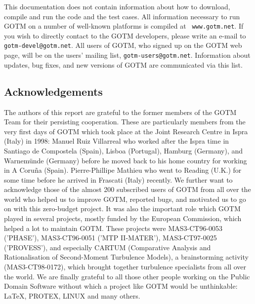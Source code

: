 This documentation does not contain information about how to download,
compile and run the code and the test cases. All information necessary
to run GOTM on a number of well-known platforms is compiled at {\tt
www.gotm.net}. If you wish to directly contact to the GOTM developers,
please write an e-mail to {\tt gotm-devel@gotm.net}. All users of GOTM,
who signed up on the GOTM web page, will be on the users' mailing
list, {\tt gotm-users@gotm.net}. Information about updates, bug fixes, and
new versions of GOTM are communicated via this list.

\subsection{Acknowledgements}

The authors of this report are grateful to the former members of the
GOTM Team for their persisting cooperation. These are particularly
members from the very first days of GOTM which took place at the Joint
Research Centre in Ispra (Italy) in 1998: Manuel Ruiz Villarreal who
worked after the Ispra time in Santiago de Compostela (Spain), Lisboa
(Portugal), Hamburg (Germany), and Warnem\"unde (Germany) before he
moved back to his home country for working in A Coru\~na
(Spain). Pierre-Phillipe Mathieu who went to Reading (U.K.) for some
time before he arrived in Frascati (Italy) recently.  We further want
to acknowledge those of the almost 200 subscribed users of GOTM from
all over the world who helped us to improve GOTM, reported bugs, and
motivated us to go on with this zero-budget project.  It was also the
important role which GOTM played in several projects, mostly funded by
the European Commission, which helped a lot to maintain GOTM.  These
projects were MAS3-CT96-0053 ('PHASE'), MAS3-CT96-0051 ('MTP
II-MATER'), MAS3-CT97-0025 ('PROVESS'), and especially CARTUM
(Comparative Analysis and Rationalisation of Second-Moment Turbulence
Models), a brainstorming activity (MAS3-CT98-0172), which brought
together turbulence specialists from all over the world.  We are
finally grateful to all those other people working on the Public
Domain Software without which a project like GOTM would be
unthinkable: \LaTeX, PROTEX, LINUX and many others.
